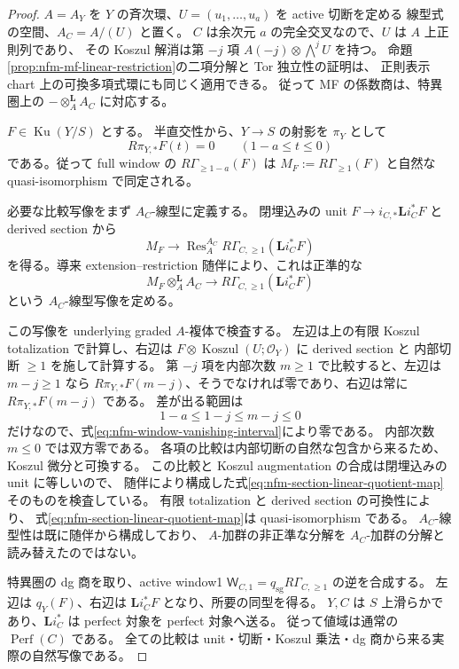 \begin{proof}
$A=A_Y$ を $Y$ の斉次環、$U=(u_1,\ldots,u_a)$ を active 切断を定める
線型式の空間、$A_C=A/(U)$ と置く。
$C$ は余次元 $a$ の完全交叉なので、$U$ は $A$ 上正則列であり、
その Koszul 解消は第 $-j$ 項 $A(-j)\otimes\bigwedge^jU$ を持つ。
命題\ref{prop:nfm-mf-linear-restriction}の二項分解と Tor 独立性の証明は、
正則表示 chart 上の可換多項式環にも同じく適用できる。
従って MF の係数商は、特異圏上の
$-\otimes_A^{\mathbf L}A_C$ に対応する。

$F\in\operatorname{Ku}(Y/S)$ とする。
半直交性から、$Y\to S$ の射影を $\pi_Y$ として
\begin{equation}\label{eq:nfm-window-vanishing-interval}
 R\pi_{Y,*}F(t)=0\qquad(1-a\le t\le0)
\end{equation}
である。従って full window の $R\Gamma_{\ge1-a}(F)$ は
$M_F:=R\Gamma_{\ge1}(F)$ と自然な quasi-isomorphism で同定される。

必要な比較写像をまず $A_C$-線型に定義する。
閉埋込みの unit $F\to i_{C,*}\mathbf Li_C^*F$ と derived section から
\[
 M_F\longrightarrow
 \operatorname{Res}_{A}^{A_C}
       R\Gamma_{C,\ge1}(\mathbf Li_C^*F)
\]
を得る。導来 extension--restriction 随伴により、これは正準的な
\begin{equation}\label{eq:nfm-section-linear-quotient-map}
 M_F\otimes_A^{\mathbf L}A_C
 \longrightarrow R\Gamma_{C,\ge1}(\mathbf Li_C^*F)
\end{equation}
という $A_C$-線型写像を定める。

この写像を underlying graded $A$-複体で検査する。
左辺は上の有限 Koszul totalization で計算し、右辺は
$F\otimes\operatorname{Koszul}(U;\mathcal O_Y)$ に derived section と
内部切断 $\ge1$ を施して計算する。
第 $-j$ 項を内部次数 $m\ge1$ で比較すると、左辺は $m-j\ge1$ なら
$R\pi_{Y,*}F(m-j)$、そうでなければ零であり、右辺は常に
$R\pi_{Y,*}F(m-j)$ である。
差が出る範囲は
\[
 1-a\le1-j\le m-j\le0
\]
だけなので、式\eqref{eq:nfm-window-vanishing-interval}により零である。
内部次数 $m\le0$ では双方零である。
各項の比較は内部切断の自然な包含から来るため、Koszul 微分と可換する。
この比較と Koszul augmentation の合成は閉埋込みの unit に等しいので、
随伴により構成した式\eqref{eq:nfm-section-linear-quotient-map}そのものを検査している。
有限 totalization と derived section の可換性により、
式\eqref{eq:nfm-section-linear-quotient-map}は quasi-isomorphism である。
$A_C$-線型性は既に随伴から構成しており、
$A$-加群の非正準な分解を $A_C$-加群の分解と読み替えたのではない。

特異圏の dg 商を取り、active window1
$\mathsf W_{C,1}=q_{\mathrm{sg}}R\Gamma_{C,\ge1}$ の逆を合成する。
左辺は $q_Y(F)$、右辺は $\mathbf Li_C^*F$ となり、所要の同型を得る。
$Y,C$ は $S$ 上滑らかであり、$\mathbf Li_C^*$ は perfect 対象を perfect 対象へ送る。
従って値域は通常の $\operatorname{Perf}(C)$ である。
全ての比較は unit・切断・Koszul 乗法・dg 商から来る実際の自然写像である。
\end{proof}

